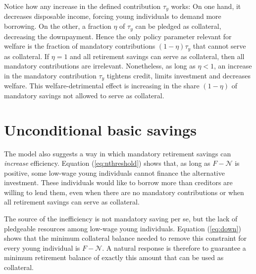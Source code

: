 \documentclass[draft,pdftex,nolinenumbers,noinfoline]{article}
\theoremstyle{plain}
\begin{document}
Notice how any increase in the defined contribution $\tau_y$ works: On one hand, it decreases disposable income, forcing young individuals to demand more borrowing. On the other, a fraction $\eta$ of $\tau_y$ can be pledged as collateral, decreasing the downpayment. Hence the only policy parameter relevant for welfare is the fraction of mandatory contributions $(1 - \eta)\tau_y$ that cannot serve as collateral. If $\eta=1$ and all retirement savings can serve as collateral, then all mandatory contributions are irrelevant. Nonetheless, as long as $\eta<1$, an increase in the mandatory contribution $\tau_y$ tightens credit, limits investment and decreases welfare. This welfare-detrimental effect is increasing in the share $(1-\eta)$ of mandatory savings not allowed to serve as collateral.

\section{Unconditional basic savings}\label{sec:ubs}
The model also suggests a way in which mandatory retirement savings can \textit{increase} efficiency. Equation (\ref{eq:nthreshold}) shows that, as long as $F-\mathcal{N}$ is positive, some low-wage young individuals cannot finance the alternative investment. These individuals would like to borrow more than creditors are willing to lend them, even when there are no mandatory contributions or when all retirement savings can serve as collateral.

The source of the inefficiency is not mandatory saving per se, but the lack of pledgeable resources among low-wage young individuals. Equation (\ref{eq:down}) shows that the minimum collateral balance needed to remove this constraint for every young individual is $F-\mathcal{N}$. A natural response is therefore to guarantee a minimum retirement balance of exactly this amount that can be used as collateral.
\end{document}
